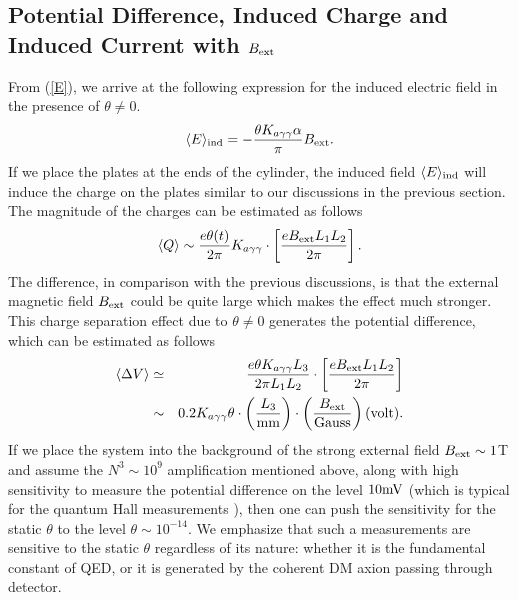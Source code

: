 \documentclass[ twocolumn,aps,prd,   
               preprintnumbers,numbers,sort&compress,nofootinbib,
                            showpacs,superscriptaddress,
               colorlinks,
               linkcolor=blue,   
               citecolor=blue]{revtex4-1}   \newcommand{\exclude}[1]{}
\newcommand{\be}{\begin{eqnarray}}
\newcommand{\ee}{\end{eqnarray}}
\def\la{\langle}
\def\ra{\rangle}
\begin{document}
\subsection{Potential Difference, Induced Charge and Induced Current with $B_{\rm ext}$}\label{enhancement}
From (\ref{E}), we arrive at the following expression for the induced electric field in the presence of $\theta\neq 0$.
\be
\label{E1}
\la E\ra_{\rm ind} =- \frac{\theta K_{a\gamma\gamma}\alpha}{\pi} B_{\rm ext}.
\ee
If we place the plates at the ends of the cylinder, the induced field  $\la E\ra_{\rm ind}$ will induce the charge on the plates 
similar to our discussions in the previous section. The magnitude of the charges can be estimated as follows
\be
\label{Q1} 
\la Q\ra \sim \frac{e\theta(t)}{2\pi} K_{a\gamma\gamma}\cdot\left[\frac{e B_{\rm ext} L_1L_2}{2\pi}\right]. 
\ee
 The difference, in comparison with the previous discussions, is that the external magnetic field $B_{\rm ext}$ could be quite large
 which makes the effect much stronger. This charge separation effect due to $\theta\neq 0$ generates the potential difference, 
 which can be estimated as follows 
 \be
\label{V1}
\la \Delta V \ra &\simeq& \frac{e\theta K_{a\gamma\gamma}L_3}{2\pi L_1L_2} 
\cdot\left[\frac{e B_{\rm ext} L_1L_2}{2\pi}\right]\\
&\sim & 0.2 K_{a\gamma\gamma} \theta \cdot \left(\frac{L_3}{\rm mm}\right) 
\cdot \left(\frac{B_{\rm ext}}{\rm Gauss}\right)  (\rm volt).\nonumber
\ee
If we place the system into the background  of the strong external field 
 $B_{\rm ext}\sim 1$T  and  assume the   $N^3\sim 10^9$ amplification mentioned above,  along with  high sensitivity to measure the potential difference on the level $10 \rm mV$ (which is typical for  the quantum Hall measurements \cite{RevModPhys.58.519,FractionalQHallRev}), then one can push the sensitivity for the static $\theta$ to the level $\theta \sim 10^{-14}$. We emphasize that such a measurements are sensitive to the static $\theta$ regardless of its nature: whether it is the fundamental constant of QED, or it is generated by the coherent DM axion passing through detector. 
 
\end{document}
